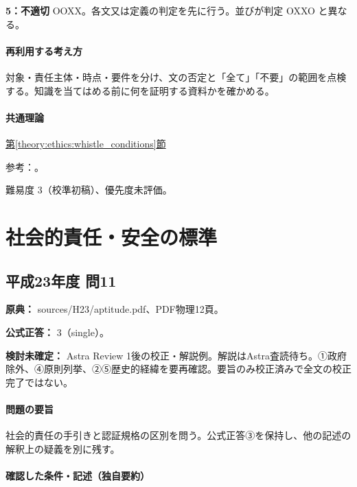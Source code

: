 \noindent\textbf{5：不適切} OOXX。各文又は定義の判定を先に行う。並びが判定 OXXO と異なる。\par

\paragraph{再利用する考え方} 対象・責任主体・時点・要件を分け、文の否定と「全て」「不要」の範囲を点検する。知識を当てはめる前に何を証明する資料かを確かめる。

\paragraph{共通理論} \hyperref[theory:ethics:whistle_conditions]{第\ref*{theory:ethics:whistle_conditions}節}

\par 参考：\cite{muroran_ethics_cases}。

\par 難易度 3（校準初稿）、優先度未評価。

\section{社会的責任・安全の標準}

\subsection{平成23年度 問11}
\label{q:h23-reg-apt-11}

\noindent\textbf{原典：} sources/H23/aptitude.pdf、PDF物理12頁。

\textbf{公式正答：} 3（single）。

\par\textbf{検討未確定：} Astra Review 1後の校正・解説例。解説はAstra査読待ち。①政府除外、④原則列挙、②⑤歴史的経緯を要再確認。要旨のみ校正済みで全文の校正完了ではない。

\paragraph{問題の要旨} 社会的責任の手引きと認証規格の区別を問う。公式正答③を保持し、他の記述の解釈上の疑義を別に残す。

\paragraph{確認した条件・記述（独自要約）}\mbox{}\par

